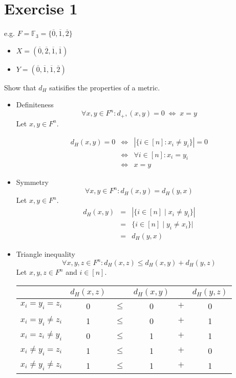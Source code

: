 \documentclass[a4paper]{scrreprt}
\newcommand\F{\mathbb F}
\begin{document}
\section*{Exercise 1}

e.g. $F=\F_3=\{\overline0,\overline1,\overline2\}$
\begin{itemize}
    \item $X = (\overline 0, \overline 2, \overline 1, \overline 1)$
    \item $Y = (\overline 0, \overline 1, \overline 1, \overline 2)$
\end{itemize}

Show that $d_H$ satisifies the properties of a metric.

\begin{itemize}

\item Definiteness
\[\forall x,y\in F^n: d_+,(x,y)=0\;\Leftrightarrow\;x=y\]
Let $x,y\in F^n$.

\begin{eqnarray*}
    d_H(x,y)=0 &\Leftrightarrow& |\{i\in[n]:x_i\neq y_i\}|=0 \\
        &\Leftrightarrow& \forall i\in[n]:x_i=y_i\\
        &\Leftrightarrow& x=y
\end{eqnarray*}

\item Symmetry
    \[\forall x,y\in F^n:d_H(x,y) = d_H(y,x)\]
    Let $x,y\in F^n$.
\begin{eqnarray*}
    d_H(x,y) &=& |\{i\in[n]\mid x_i\neq y_i\}| \\
             &=& \{i\in[n]\mid y_i\neq x_i\}|\\
             &=& d_H(y,x)
\end{eqnarray*}

\item Triangle inequality
    \[\forall x,y,z\in F^n:d_H(x,z)\leq d_H(x,y)+d_H(y,z)\]
Let $x,y,z\in F^n$ and $i\in[n]$.

\begin{center}
\begin{tabular}{c|ccccc}
    & $d_H(x,z)$ && $d_H(x,y)$ && $d_H(y,z)$ \\
    \hline
    $x_i=y_i=z_i$ & 0 & $\leq$ & 0 & $+$ & 0 \\
    $x_i=y_i\neq z_i$ & 1 & $\leq$ & 0 & $+$  &1 \\
    $x_i=z_i\neq y_i$ & 0 & $\leq$ & 1 & $+$ & 1 \\
    $x_i\neq y_i=z_i$ & 1 & $\leq$ & 1 & $+$ & 0 \\
    $x_i\neq y_i\neq z_i$ & 1 & $\leq$ & 1 & $+$ & 1 \\
\end{tabular}
\end{center}

\end{itemize}
\end{document}

